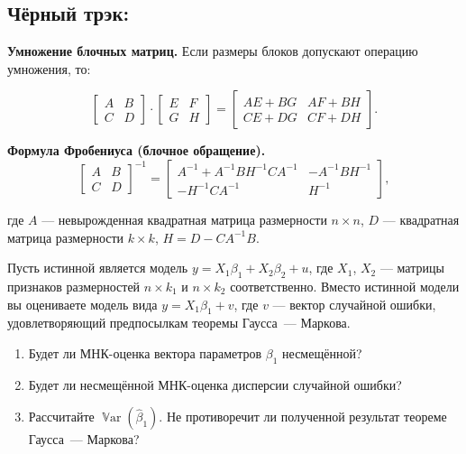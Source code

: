 \documentclass[12pt]{article}
\DeclareMathOperator{\Var}{\mathbb{V}ar}
\renewcommand{\b}{\beta}
\newcommand{\hb}{\hat{\beta}}
\begin{document}
\subsection{Чёрный трэк:}

\textbf{Умножение блочных матриц.} Если размеры блоков допускают операцию умножения, то:

\[
\left[
\begin{array}{c|c}
A & B \\
\hline
C & D
\end{array}
\right]
\cdot
\left[
\begin{array}{c|c}
E & F \\
\hline
G & H
\end{array}
\right]
=
\left[
\begin{array}{c|c}
AE + BG &  AF+BH\\
\hline
CE+DG & CF+DH
\end{array}
\right].
\]

\bigskip

\textbf{Формула Фробениуса (блочное обращение).}
\[
\left[
\begin{array}{c|c}
A & B \\
\hline
C & D
\end{array}
\right]^{-1}=
\left[
\begin{array}{c|c}
A^{-1}+A^{-1}BH^{-1}CA^{-1} & -A^{-1}BH^{-1} \\
\hline
-H^{-1}CA^{-1} & H^{-1}
\end{array}
\right],
\]

где $A$ --- невырожденная квадратная матрица размерности $n \times n$, $D$ --- квадратная матрица размерности $k \times k$, $H = D - CA^{-1}B$.

\begin{problem}
Пусть истинной является модель $y = X_1\b_1+ X_2\b_2+u$, где $X_1$, $X_2$  --- матрицы признаков размерностей $n \times k_1$ и $n \times k_2$ соответственно. Вместо истинной модели вы оцениваете модель вида $y = X_1\b_1+v$, где $v$ --- вектор случайной ошибки, удовлетворяющий предпосылкам теоремы Гаусса~--- Маркова.
\begin{enumerate}
    \item Будет ли МНК-оценка вектора параметров $\b_1$ несмещённой?
    \item Будет ли несмещённой МНК-оценка дисперсии случайной ошибки?
    \item Рассчитайте $\Var(\hb_1)$. Не противоречит ли полученной результат теореме Гаусса~--- Маркова?
\end{enumerate}
\end{problem}
\end{document}
